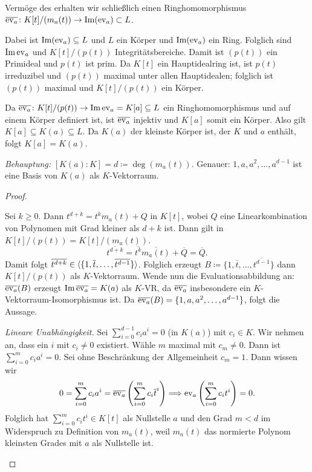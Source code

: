 \documentclass[12pt,a4paper]{scrartcl}
\begin{document}
\begin{description}
	Vermöge des  erhalten wir schließlich einen Ringhomomorphismus $\overline{\operatorname{ev}_a}\colon K[t]/(m_a(t))\to \operatorname{Im}(\operatorname{ev}_a)\subset L$.
	
	
	Dabei ist $\operatorname{Im}(\operatorname{ev}_a)\subseteq L$ und $L$ ein Körper und $\operatorname{Im}(\operatorname{ev}_a)$ ein Ring. Folglich sind $\operatorname{Im}\operatorname{ev}_a$ und $K[t]/(p(t))$ Integritätsbereiche. Damit ist $(p(t))$ ein Primideal und $p(t)$ ist prim. Da $K[t]$ ein Hauptidealring ist, ist $p(t)$ irreduzibel und $(p(t))$ maximal unter allen Hauptidealen; folglich ist $(p(t))$ maximal und $K[t]/(p(t))$ ein Körper.
	
	Da $\overline{\operatorname{ev}_a}\colon K[t]/(p(t))\to \operatorname{Im}\operatorname{ev}_a = K[a]\subseteq L$ ein Ringhomomorphismus und auf einem Körper definiert ist, ist $\overline{\operatorname{ev}_a}$ injektiv und $K[a]$ somit ein Körper. Also gilt $K[a]\subseteq K(a) \subseteq L$. Da $K(a)$ der kleinste Körper ist, der $K$ und $a$ enthält, folgt $K[a] = K(a)$.
	
	\emph{Behauptung:} $[K(a):K] = d \coloneqq \deg(m_a(t))$. Genauer: $1, a, a^2,\dots, a^{d-1}$ ist eine Basis von $K(a)$ als $K$-Vektorraum.
	\begin{proof}
		\leavevmode
		\begin{description}
			\item[\emph{Erzeugendensystem.}] Sei $k\geq 0$. Dann $t^{d+k} = t^km_a(t)+Q$ in $K[t]$, wobei $Q$ eine Linearkombination von Polynomen mit Grad kleiner als $d+k$ ist. Dann gilt in $K[t]/(p(t)) = K[t]/(m_a(t))$.
			\[\overline{t^{d+k}} = \overline{t^k}\overline{m_a(t)} + \overline{Q} = \overline{Q}.\]
			Damit folgt $\overline{t^{d+k}} \in \langle \{1, \overline{t}, \dots, \overline{t^{d-1}}\}\rangle$. Folglich erzeugt $B \coloneqq  \{1, \overline{t}, \dots, \overline{t^{d-1}}\}$ dann $K[t]/(p(t))$ als $K$-Vektorraum. Wende nun die Evaluationsabbildung an:
			$\overline{\operatorname{ev}_a}(B)$ erzeugt $\operatorname{Im}\overline{\operatorname{ev}_a} = K(a)$ als $K$-VR, da $\overline{\operatorname{ev}_a}$ insbesondere ein $K$-Vektorraum-Isomorphismus ist. Da $\overline{\operatorname{ev}_a}(B) = \{1, a, a^2,\dots, a^{d-1}\}$, folgt die Aussage.
			\item{\emph{Lineare Unabhängigkeit.}} Sei $\sum_{i =0}^{d-1}c_ia^i = 0$ (in $K(a)$) mit $c_i\in K$. Wir nehmen an, dass ein $i$ mit $c_i\neq 0$ existiert. Wähle $m$ maximal mit $c_m \neq 0$. Dann ist $\sum_{i = 0}^{m}c_ia^i = 0$. Sei ohne Beschränkung der Allgemeinheit $c_m = 1$. Dann wissen wir
			\[0 = \sum_{i = 0}^m c_ia^i = \overline{\operatorname{ev}_a}\left(\sum_{i=0}^mc_i\overline{t}^i\right)\Longrightarrow \operatorname{ev}_a\left(\sum_{i=0}^m c_it^i\right) = 0.\]
			Folglich hat $\sum_{i=0}^mc_it^i\in K[t]$ als Nullstelle $a$ und den Grad $m <d$ im Widerspruch zu Definition von $m_a(t)$, weil $m_a(t)$ das normierte Polynom kleinsten Grades mit $a$ als Nullstelle ist.
    \qedhere
		\end{description}
	\end{proof}
\end{description}
\end{document}
